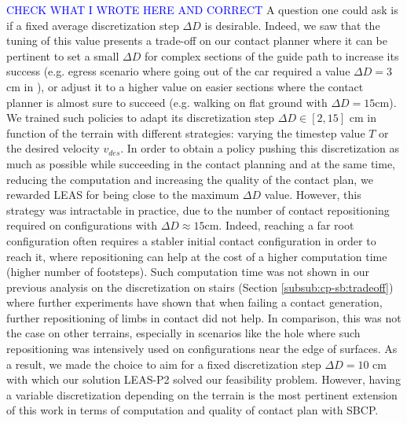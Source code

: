 \textcolor{blue}{CHECK WHAT I WROTE HERE AND CORRECT}
A question one could ask is if a fixed average discretization step $\Delta D$ is desirable. Indeed, we saw that the tuning of this value presents a trade-off on our contact planner where it can be pertinent to set a small $\Delta D$ for complex sections of the guide path to increase its success (e.g. egress scenario where going out of the car required a value $\Delta D=3$cm in \cite{AcyclicCP}), or adjust it to a higher value on easier sections where the contact planner is almost sure to succeed (e.g. walking on flat ground with $\Delta D=15$cm).
We trained such policies to adapt its discretization step $\Delta D \in [2,15]$ cm in function of the terrain with different strategies: varying the timestep value $T$ or the desired velocity $v_{des}$.
In order to obtain a policy pushing this discretization as much as possible while succeeding in the contact planning and at the same time, reducing the computation and increasing the quality of the contact plan, we rewarded LEAS for being close to the maximum $\Delta D$ value.
However, this strategy was intractable in practice, due to the number of contact repositioning required on configurations with $\Delta D \approx 15$cm.  Indeed, reaching a far root configuration often requires a stabler initial contact configuration in order to reach it, where repositioning can help at the cost of a higher computation time (higher number of footsteps).
Such computation time was not shown in our previous analysis on the discretization on stairs (Section \ref{subsub:cp-sb:tradeoff}) where further experiments have shown that when failing a contact generation, further repositioning of limbs in contact did not help. 
In comparison, this was not the case on other terrains, especially in scenarios like the hole where such repositioning was intensively used on configurations near the edge of surfaces.
As a result, we made the choice to aim for a fixed discretization step $\Delta D=10$ cm with which our solution LEAS-P2 solved our feasibility problem.
However, having a variable discretization depending on the terrain is the most pertinent extension of this work in terms of computation and quality of contact plan with SBCP.


